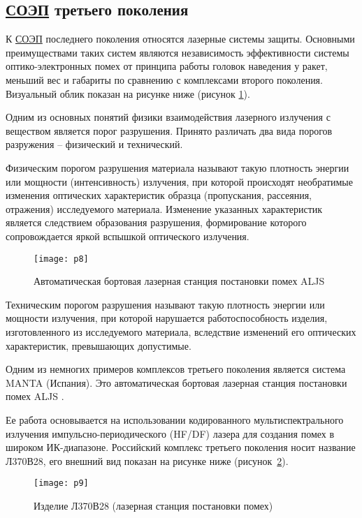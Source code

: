 \subsection{ \hyperref[acroSOEP]{СОЭП} третьего поколения}	
К  \hyperref[acroSOEP]{СОЭП} последнего поколения относятся лазерные системы защиты. Основными преимуществами таких систем являются независимость эффективности системы оптико-электронных помех от принципа работы головок наведения у ракет, меньший вес и габариты по сравнению с комплексами второго поколения. Визуальный облик показан на рисунке ниже (рисунок \ref{fig:p8}).

Одним из основных понятий физики взаимодействия лазерного излучения с веществом является порог разрушения. Принято различать два вида порогов разружения – физический и технический. 

Физическим порогом разрушения материала называют такую плотность энергии или мощности (интенсивность) излучения, при которой происходят необратимые изменения оптических характеристик образца (пропускания, рассеяния, отражения) исследуемого материала. Изменение указанных характеристик является следствием образования разрушения, формирование которого сопровождается яркой вспышкой оптического излучения. 

\begin{figure}[ht]
	\centering
	\texttt{[image: p8]} 
	\caption{Автоматическая бортовая лазерная станция постановки помех ALJS}
	\label{fig:p8}
\end{figure}

Техническим порогом разрушения называют такую плотность энергии или мощности излучения, при которой нарушается работоспособность изделия, изготовленного из исследуемого материала, вследствие изменений его оптических характеристик, превышающих допустимые.

Одним из немногих примеров комплексов третьего поколения является система MANTA (Испания). Это автоматическая бортовая лазерная станция постановки помех ALJS \cite[]{manta}.

Ее работа основывается на использовании кодированного мультиспектрального излучения импульсно-периодического (HF/DF) лазера для создания помех в широком ИК-диапазоне.
Российский комплекс третьего поколения носит название Л370В28, его внешний вид показан на рисунке ниже (рисунок~\ref{fig:p9}). 

\begin{figure}[ht]
	\centering
	\texttt{[image: p9]} 
	\caption{Изделие Л370В28 (лазерная станция постановки помех)}
	\label{fig:p9}
\end{figure}


